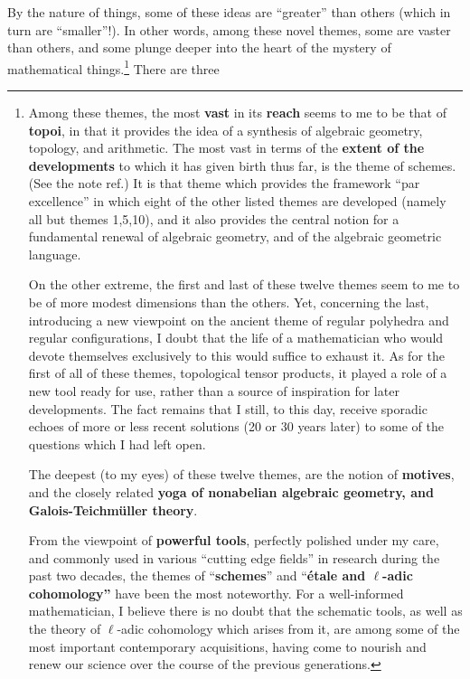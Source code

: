 By the nature of things, some of these ideas are ``greater'' than others (which in turn
are ``smaller''!). 
In other words, among these novel themes, some are vaster than others, and some plunge
deeper into the heart of the mystery of mathematical things.\footnote{Among these
themes, the most \textbf{vast} in its \textbf{reach} 
seems to me to be that of \textbf{topoi}, in that it provides the idea of a synthesis of algebraic
geometry, topology, and arithmetic. The most vast in terms of the \textbf{extent
of the developments} to which it has given birth thus far, is the theme of schemes.
(See 
the note ref.) It is that theme which provides the framework 
``par excellence''
in which eight of the other listed themes are developed (namely all but themes 1,5,10),
and it also provides the central notion for a fundamental renewal of algebraic geometry,
and of the algebraic geometric language. 

On the other extreme, the first and last of these twelve themes seem to me to be of more
modest dimensions than the others.
Yet, concerning the last, introducing a new viewpoint 
on the ancient theme of regular polyhedra and regular configurations,
I doubt that the life of a mathematician
who would devote themselves exclusively to this would suffice to exhaust it.
As for the first of all of these themes, topological tensor products, it played a role of
a new tool ready for use, rather than a source of inspiration for later developments.
The fact remains that I still, to this day, receive sporadic echoes of more or less
recent solutions 
(20 or 30 years later) 
to some of the questions which I had left open.

The deepest (to my eyes) of these twelve themes, are the notion of \textbf{motives}, 
and the closely related \textbf{yoga of nonabelian algebraic geometry, and
Galois-Teichm\"uller theory}.

From the viewpoint of \textbf{powerful tools}, perfectly polished under my care, and
commonly used in various ``cutting edge fields'' in research during the past two decades,
the themes of ``\textbf{schemes}'' and ``\textbf{\'etale and $\ell$-adic cohomology''}
have been the most noteworthy.
For a well-informed mathematician, I believe there is no doubt that the
schematic tools, as well as the theory of $\ell$-adic cohomology which arises from it,
are among some of the most important contemporary acquisitions, having come to nourish and
renew our science over the course of the previous generations.} There are three  
